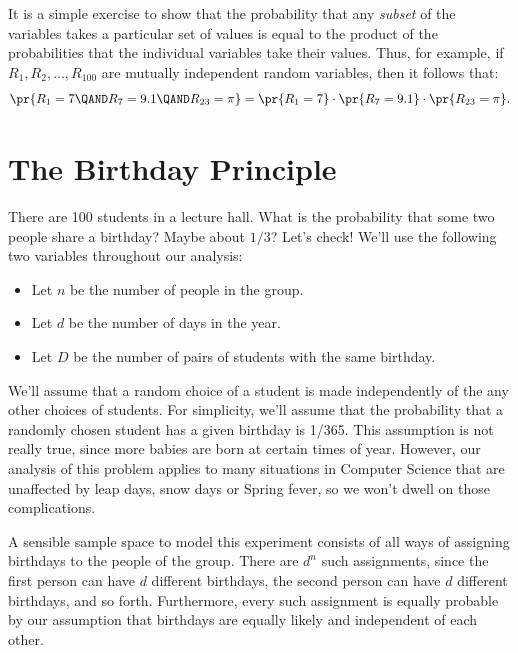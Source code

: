 It is a simple exercise to show that the probability that any {\em
subset} of the variables takes a particular set of values is equal to the
product of the probabilities that the individual variables take their
values.  Thus, for example, if $R_1, R_2, \dots, R_{100}$ are mutually
independent random variables, then it follows that:
\[
\pr{R_1 = 7 \QAND R_7 = 9.1 \QAND R_{23} = \pi} = \pr{R_1 = 7} \cdot
\pr{R_7 = 9.1} \cdot \pr{R_{23} = \pi}.
\]



\section{The Birthday Principle}

There are 100 students in a lecture hall.  What is the probability that
some two people share a birthday?  Maybe about $1/3$?  Let's check!  We'll
use the following two variables throughout our analysis:

\begin{itemize}

\item Let $n$ be the number of people in the group.

\item Let $d$ be the number of days in the year.

\item Let $D$ be the number of pairs of students with the same birthday.

\end{itemize}

We'll assume that a random choice of a student is made independently of
the any other choices of students.  For simplicity, we'll assume that the
probability that a randomly chosen student has a given birthday is 1/365.
This assumption is not really true, since more babies are born at certain
times of year.  However, our analysis of this problem applies to many
situations in Computer Science that are unaffected by leap days, snow days
or Spring fever, so we won't dwell on those complications.

A sensible sample space to model this experiment consists of all ways of
assigning birthdays to the people of the group.  There are $d^n$ such
assignments, since the first person can have $d$ different birthdays, the
second person can have $d$ different birthdays, and so forth.
Furthermore, every such assignment is equally probable by our assumption
that birthdays are equally likely and independent of each other.

